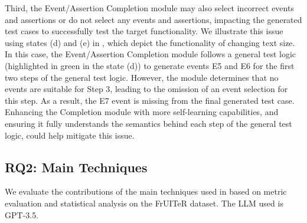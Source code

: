 Third, the Event/Assertion Completion module may also select incorrect events and assertions or do not select any events and assertions, impacting the generated test cases to successfully test the target functionality.
We illustrate this issue using states (d) and (e) in , which depict the functionality of changing text size.
In this case, the Event/Assertion Completion module follows a general test logic (highlighted in green in the state (d)) to generate events E5 and E6 for the first two steps of the general test logic. However, the module determines that no events are suitable for Step 3, leading to the omission of an event selection for this step. As a result, the E7 event is missing from the final generated test case.
Enhancing the Completion module with more self-learning capabilities, and ensuring it fully understands the semantics behind each step of the general test logic, could help mitigate this issue.









\subsection{RQ2: Main Techniques}
We evaluate the contributions of the main techniques used in \toolNameSmall{} based on metric evaluation and statistical analysis on the FrUITeR dataset. The LLM used is GPT-3.5.

